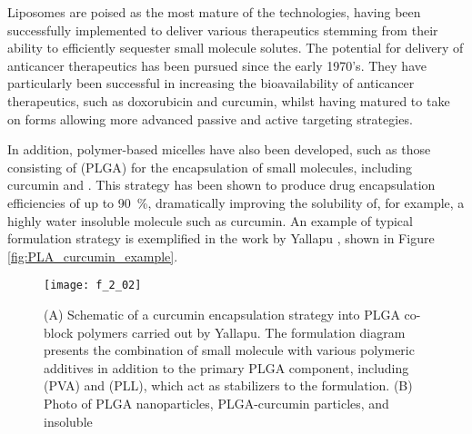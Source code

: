 \begin{refsection}
Liposomes are poised as the most mature of the technologies, having been
successfully implemented to deliver various therapeutics stemming from their
ability to efficiently sequester small molecule
solutes.\cite{Ranson1996,Sessa1968,Bangham1965,Bangham1974} The potential for
delivery of anticancer therapeutics has been pursued since the early
1970's.\cite{Gregoriadis1974} They have particularly been successful in
increasing the bioavailability of anticancer therapeutics, such as doxorubicin
and curcumin, whilst having matured to take on forms allowing more advanced
passive and active targeting strategies.\cite{Al-Jamal2012,Huang1994,Li2007}

In addition, polymer-based micelles have also been developed, such as those
consisting of  (PLGA) for the
encapsulation of small molecules, including curcumin and
.\cite{Li2009,Yallapu2010b} This strategy has
been shown to produce drug encapsulation efficiencies of up to \SI{90}{\percent},
dramatically improving the solubility of, for example, a highly water insoluble
molecule such as curcumin. An example of typical formulation strategy is
exemplified in the work by Yallapu , shown in Figure
\ref{fig:PLA_curcumin_example}.\cite{Yallapu2010b}
\begin{figure}[h!] \centering \texttt{[image: f\_2\_02]}
    \caption[(A) Schematic of a curcumin encapsulation strategy into PLGA co-block
    polymers carried out by Yallapu. The formulation diagram presents the
    combination of small molecule with various polymeric additives in addition
    to the primary PLGA component, including  (PVA) and
     (PLL), which act as stabilizers to the formulation.
    (B) Photo of PLGA nanoparticles, PLGA-curcumin particles, and insoluble
    curcumin in water, exemplifying the enhanced solubility of encapsulated
    curcumin (middle vial) (C) Particle size distribution of PLGA-curcumin as
    measured by dynamic light scattering (DLS) (D) Transmission electron
    micrographs of nanoparticle.
    ]{(A) Schematic of a curcumin encapsulation strategy into PLGA co-block
    polymers carried out by Yallapu. The formulation diagram presents the
    combination of small molecule with various polymeric additives in addition
    to the primary PLGA component, including  (PVA) and
     (PLL), which act as stabilizers to the formulation.
    (B) Photo of PLGA nanoparticles, PLGA-curcumin particles, and insoluble
}
\end{figure}
\end{refsection}
